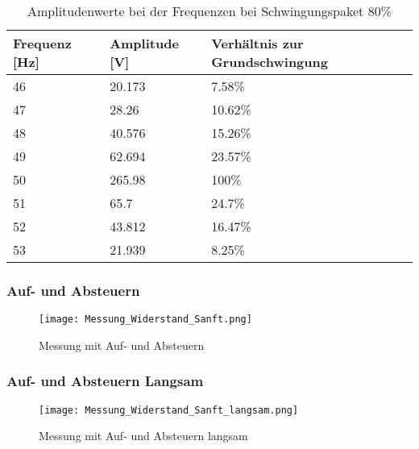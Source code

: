 \begin{table}[ht!]
	\centering
	\begin{tabular}{|l|l|l|}
		\hline
		Frequenz {[}Hz{]} & Amplitude {[}V{]} & Verhältnis zur Grundschwingung \\ \hline
		46                & 20.173            & 7.58\%                         \\ \hline
		47                & 28.26             & 10.62\%                        \\ \hline
		48                & 40.576            & 15.26\%                        \\ \hline
		49                & 62.694            & 23.57\%                        \\ \hline
		50                & 265.98            & 100\%                          \\ \hline
		51                & 65.7              & 24.7\%                         \\ \hline
		52                & 43.812            & 16.47\%                        \\ \hline
		53                & 21.939            & 8.25\%                         \\ \hline
	\end{tabular}
\caption{Amplitudenwerte bei der Frequenzen bei Schwingungspaket 80\%}\label{tab:Mess_Spannung_Schwing_80}
\end{table}

\newpage
\subsubsection*{Auf- und Absteuern}
\begin{figure}[ht!]
	\centering
	\texttt{[image: Messung\_Widerstand\_Sanft.png]}	
	\caption{Messung mit Auf- und Absteuern}\label{fig:Mess_Sanft}
\end{figure}

\newpage
\subsubsection*{Auf- und Absteuern Langsam}
\begin{figure}[ht!]
	\centering
	\texttt{[image: Messung\_Widerstand\_Sanft\_langsam.png]}	
	\caption{Messung mit Auf- und Absteuern langsam}\label{fig:Mess_Sanft_langsam}
\end{figure}

